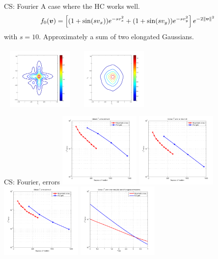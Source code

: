 \documentclass[hyperref={bookmarksopen, colorlinks, linkcolor=blue, urlcolor=green, citecolor=red}, color={usenames,dvipsnames}]{beamer}
\begin{document}
\begin{frame}{CS: Fourier}
A case where the HC works well.
\[
    f_0({\bm v}) = \left[(1+\sin(sv_x))e^{-sv_x^2} + 
            (1+\sin(sv_y))e^{-sv_y^2}\right] e^{-2\|{\bm v}\|^2}
\]
with $s=10$. Approximately a sum of two elongated Gaussians. \\~\\

\centering
\includegraphics[width=3.87cm,height=3cm]{../figs/hcboltz/crossed-1}
\includegraphics[width=3.87cm,height=3cm]{../figs/hcboltz/crossed-3}
\end{frame}

\begin{frame}{CS: Fourier, errors}
\centering
\includegraphics[width=4.0cm]{../figs/hcboltz/hc1-l2-1}
\includegraphics[width=4.0cm]{../figs/hcboltz/hc1-l2-2} \\
\includegraphics[width=4.0cm]{../figs/hcboltz/hc1-l2-3}
\includegraphics[width=4.0cm]{../figs/hcboltz/hc1-l2-time}
\end{frame}
\end{document}

